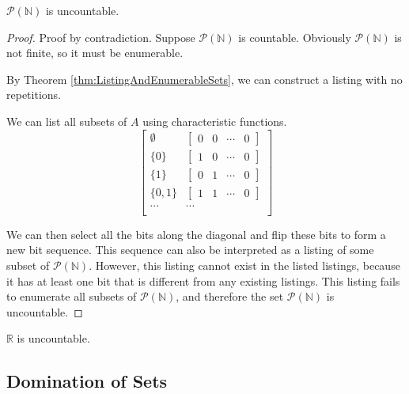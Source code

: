 \begin{theorem}
    \label{thm:CantorsTheorem}
    $\mathcal{P}(\mathbb{N})$ is uncountable.
\end{theorem}
\begin{proof}
    Proof by contradiction. Suppose $\mathcal{P}(\mathbb{N})$ is countable. Obviously $\mathcal{P}(\mathbb{N})$ is not finite, so it must be enumerable.

    By Theorem \ref{thm:ListingAndEnumerableSets}, we can construct a listing with no repetitions.

    We can list all subsets of $A$ using characteristic functions.
    \[\begin{bmatrix}
        \emptyset & \begin{bmatrix} 0 & 0 & \cdots & 0 \end{bmatrix}\\
        \{0\} & \begin{bmatrix} 1 & 0 & \cdots & 0 \end{bmatrix}\\
        \{1\} & \begin{bmatrix} 0 & 1 & \cdots & 0 \end{bmatrix}\\
        \{0, 1\} & \begin{bmatrix} 1 & 1 & \cdots & 0 \end{bmatrix}\\
        \cdots & \cdots\\
    \end{bmatrix}\]

    We can then select all the bits along the diagonal and flip these bits to form a new bit sequence. This sequence can also be interpreted as a listing of some subset of $\mathcal{P}(\mathbb{N})$. However, this listing cannot exist in the listed listings, because it has at least one bit that is different from any existing listings. This listing fails to enumerate all subsets of $\mathcal{P}(\mathbb{N})$, and therefore the set $\mathcal{P}(\mathbb{N})$ is uncountable.
\end{proof}

\begin{corollary}
    $\mathbb{R}$ is uncountable.
\end{corollary}

\subsection{Domination of Sets}

